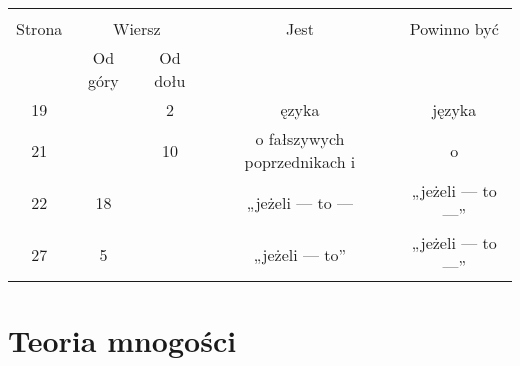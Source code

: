 \documentclass[a4paper,11pt]{article}
\begin{document}
\newpage





\begin{center}

  \begin{tabular}{|c|c|c|c|c|}
    \hline
    & \multicolumn{2}{c|}{} & & \\
    Strona & \multicolumn{2}{c|}{Wiersz} & Jest
                              & Powinno być \\ \cline{2-3}
    & Od góry & Od dołu & & \\
    \hline
    19  & &  2 & ęzyka & języka \\
    21  & & 10 & o fałszywych poprzednikach i & o \\
    22  & 18 & & „jeżeli --- to --- & „jeżeli --- to ---” \\
    27  &  5 & & „jeżeli --- to” & „jeżeli --- to ---” \\
    \hline
  \end{tabular}

\end{center}

\vspace{\spaceTwo}










\newpage
\section{Teoria mnogości}

\vspace{\spaceTwo}















{}






\end{document}
